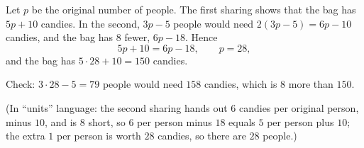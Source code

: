 Let $p$ be the original number of people. The first sharing shows that the bag has $5p+10$ candies. In the second, $3p-5$ people would need $2(3p-5)=6p-10$ candies, and the bag has $8$ fewer, $6p-18$. Hence
\[
5p+10=6p-18,\qquad p=28 ,
\]
and the bag has $5\cdot28+10=\boxed{150}$ candies.

Check: $3\cdot28-5=79$ people would need $158$ candies, which is $8$ more than $150$.

(In ``units'' language: the second sharing hands out $6$ candies per original person, minus $10$, and is $8$ short, so $6$ per person minus $18$ equals $5$ per person plus $10$; the extra $1$ per person is worth $28$ candies, so there are $28$ people.)
